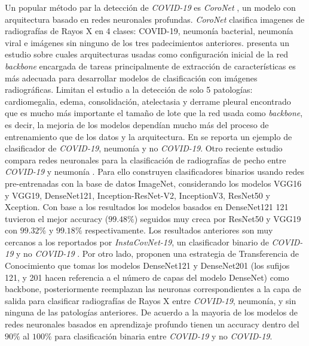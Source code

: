 Un popular método par la detección de \textit{COVID-19} es \textit{CoroNet} \cite{wang2020covid}, un
modelo con arquitectura basado en redes neuronales profundas. \textit{CoroNet} clasifica imagenes de
radiografías de Rayos X en 4 clases: COVID-19, neumonía bacterial, neumonía viral e imágenes sin
ninguno de los tres padecimientos anteriores. \citeauthor*{bressem2020comparing} presenta un estudio
sobre cuales arquitecturas usadas como configuración inicial de la red \textit{backbone} encargada
de tareas principalmente de extracción de características es más adecuada para desarrollar modelos
de clasificación con imágenes radiográficas. Limitan el estudio a la detección de solo 5 patologías:
cardiomegalia, edema, consolidación, atelectasia y derrame pleural encontrado que es mucho más
importante el tamaño de lote que la red usada como \textit{backbone}, es decir, la mejoria de los
modelos dependían mucho más del proceso de entrenamiento que de los datos y la arquitectura.
En \cite{zhong2021deep} se reporta un ejemplo de clasificador de \textit{COVID-19}, neumonía y
no \textit{COVID-19}. Otro reciente estudio compara redes neuronales para la clasificación de
radiografías de pecho entre \textit{COVID-19} y neumonía \cite{shazia2021comparative}. Para ello
construyen clasificadores binarios usando redes pre-entrenadas con la base de datos ImageNet,
considerando los modelos VGG16 y VGG19, DenseNet121, Inception-ResNet-V2, InceptionV3, ResNet50 y
Xception. Con base a los resultados los modelos basados en DenseNet121 121 tuvieron el mejor
accuracy ($99.48\%$) seguidos muy creca por ResNet50 y VGG19 con $99.32\%$ y $99.18\%$
respectivamente. Los resultados anteriores son muy cercanos a los reportados por
\textit{InstaCovNet-19}, un clasificador binario de \textit{COVID-19} y no \textit{COVID-19}
\cite{gupta2021instacovnet}. Por otro lado, \citeauthor*{bassi2021deep} proponen una estrategia de
Transferencia de Conocimiento que tomas los modelos DenseNet121 y DenseNet201 (los sufijos 121, y 201
hacen referencia a el número de capas del modelo DenseNet) como backbone, posteriormente reemplazan
las neuronas correspondientes a la capa de salida para clasificar radiografías de Rayos X entre
\textit{COVID-19}, neumonía, y sin ninguna de las patologías anteriores. De acuerdo a
\citeauthor{shoeibi2020automated} la mayoria de los modelos de redes neuronales basados en aprendizaje
profundo tienen un accuracy dentro del $90\%$ al $100\%$ para clasificación binaria entre
\textit{COVID-19} y no \textit{COVID-19}.

